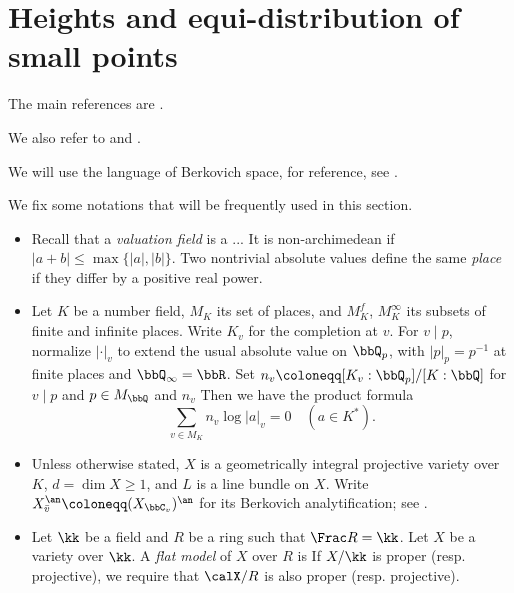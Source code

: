 \section{Heights and equi-distribution of small points}

The main references are \cite{Yuan-Guo-2025-FirstCourseArakelov}.

We also refer to \cite[Appendices~A.5--A.6 and \S 5.4]{Yuan-Zhang-2026-AdelicLineBundles} and \cite[Chapter~3]{Chambert-Loir-2012-ArakelovGeometryHeights}.

We will use the language of Berkovich space, for reference, see \cite{Berkovich-2012-SpectralTheoryAnalytic,Ducros-Favre-Nicaise-2015-BerkovichSpacesApplications}.

\begin{notation}[label=\labelNFM{not:berkovich-space-and-a-geometry}, status=draft, tag=0000000]
	We fix some notations that will be frequently used in this section.
	\begin{itemize}
		\item Recall that a \emph{valuation field} is a ...
		      It is non-archimedean if $|a + b| \leq \max\{|a|,|b|\}$.
		      Two nontrivial absolute values define the same \emph{place} if they differ by a positive real power.
		      \Yang{}
		\item Let $K$ be a number field, $M_K$ its set of places, and $M_K^f$, $M_K^\infty$ its subsets of finite and infinite places.
		      Write $K_v$ for the completion at $v$.
		      For $v \mid p$, normalize $|\cdot|_v$ to extend the usual absolute value on $\bbQ_p$, with $|p|_p = p^{-1}$ at finite places and $\bbQ_\infty = \bbR$.
		      Set $n_v \coloneqq [K_v:\bbQ_p]/[K:\bbQ]$ for $v \mid p$ and $p \in M_\bbQ$ and $n_v$ \Yang{}
		      Then we have the product formula
		      \[ \sum_{v \in M_K}n_v\log|a|_v = 0 \quad (a \in K^*). \]
		\item Unless otherwise stated, $X$ is a geometrically integral projective variety over $K$, $d = \dim X \geq 1$, and $L$ is a line bundle on $X$.
		      Write $X_{\bar{v}}^\an \coloneqq (X_{\bbC_v})^\an$ for its Berkovich analytification; see \Yang{}.

		\item Let $\kk$ be a field and $R$ be a ring such that $\Frac R = \kk$.
		      Let $X$ be a variety over $\kk$.
		      A \emph{flat model} of $X$ over $R$ is
		      If $X/\kk$ is proper (resp. projective), we require that $\calX/R$ is also proper (resp. projective).
		      \Yang{}
	\end{itemize}
	\Yang{}
\end{notation}
















